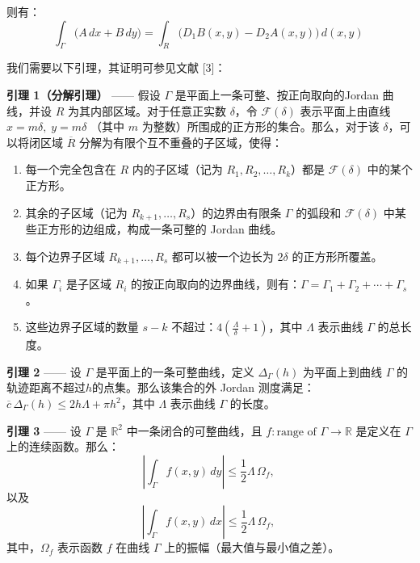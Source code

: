 则有：
$$
\int_{\Gamma} \big( A\,dx + B\,dy \big)
= 
\int_{R} \big( D_1 B(x, y) - D_2 A(x, y) \big) \, d(x, y)~
$$

我们需要以下引理，其证明可参见文献 [3]：

\textbf{引理 1（分解引理）} —— 假设 $\Gamma$ 是平面上一条可整、按正向取向的Jordan 曲线，并设 $R$ 为其内部区域。对于任意正实数 $\delta$，令 $\mathcal{F}(\delta)$ 表示平面上由直线$x = m\delta,\; y = m\delta$
（其中 $m$ 为整数）所围成的正方形的集合。那么，对于该 $\delta$，可以将闭区域 $\overline{R}$ 分解为有限个互不重叠的子区域，使得：
\begin{enumerate}
\item 每一个完全包含在 $R$ 内的子区域（记为 $R_1, R_2, \ldots, R_k$）都是 $\mathcal{F}(\delta)$ 中的某个正方形。
\item 其余的子区域（记为 $R_{k+1}, \ldots, R_s$）的边界由有限条 $\Gamma$ 的弧段和 $\mathcal{F}(\delta)$ 中某些正方形的边组成，构成一条可整的 Jordan 曲线。
\item 每个边界子区域 $R_{k+1}, \ldots, R_s$ 都可以被一个边长为 $2\delta$ 的正方形所覆盖。
\item 如果 $\Gamma_i$ 是子区域 $R_i$ 的按正向取向的边界曲线，则有：$\Gamma = \Gamma_1 + \Gamma_2 + \cdots + \Gamma_s$。
\item 这些边界子区域的数量 $s-k$ 不超过：$4\left(\frac{\Lambda}{\delta} + 1\right)$，其中 $\Lambda$ 表示曲线 $\Gamma$ 的总长度。
\end{enumerate}
\textbf{引理 2} —— 设 $\Gamma$ 是平面上的一条可整曲线，定义 $\Delta_{\Gamma}(h)$ 为平面上到曲线 $\Gamma$ 的轨迹距离不超过$h$的点集。那么该集合的外 Jordan 测度满足：$\overline{c}\,\Delta_{\Gamma}(h) \leq 2h\Lambda + \pi h^2$，其中 $\Lambda$ 表示曲线 $\Gamma$ 的长度。

\textbf{引理 3} —— 设 $\Gamma$ 是 $\mathbb{R}^2$ 中一条闭合的可整曲线，且 $f : \text{range of } \Gamma \to \mathbb{R}$ 是定义在 $\Gamma$ 上的连续函数。那么：
$$
\left| \int_{\Gamma} f(x, y)\, dy \right| \leq \frac{1}{2} \Lambda \, \Omega_f,~
$$
以及
$$
\left| \int_{\Gamma} f(x, y)\, dx \right| \leq \frac{1}{2} \Lambda \, \Omega_f,~
$$
其中，$\Omega_f$ 表示函数 $f$ 在曲线 $\Gamma$ 上的振幅（最大值与最小值之差）。
